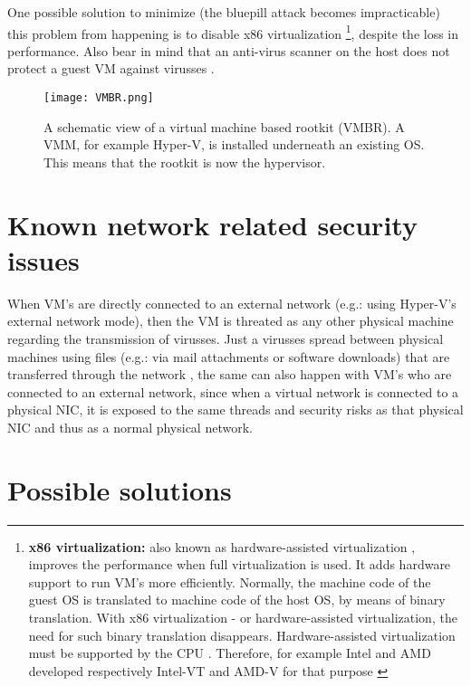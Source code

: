 One possible solution to minimize (the bluepill attack becomes impracticable) this problem from happening is to disable x86 virtualization \footnote{\textbf{x86 virtualization:} also known as hardware-assisted virtualization \citep{HardwareVirt1}, improves the performance when full virtualization is used. It adds hardware support to run VM's more efficiently. Normally, the machine code of the guest OS is translated to machine code of the host OS, by means of binary translation. With x86 virtualization - or hardware-assisted virtualization, the need for such binary translation disappears. Hardware-assisted virtualization must be supported by the CPU \citep{HardwareVirt3}. Therefore, for example Intel and AMD developed respectively Intel-VT and AMD-V for that purpose \citep{HardwareVirt2}}, despite the loss in performance. Also bear in mind that an anti-virus scanner on the host does not protect a guest VM against virusses \citep{Virus}. 
\begin{figure}[h]
	\label{fig:LibVirt}
    \centering
    \texttt{[image: VMBR.png]}
    \caption[VM based rootkit]{A schematic view of a virtual machine based rootkit (VMBR). A VMM, for example Hyper-V, is installed underneath an existing OS. This means that the rootkit is now the hypervisor.}
\end{figure}

\clearpage

\section{Known network related security issues} 

When VM's are directly connected to an external network (e.g.: using Hyper-V's external network mode), then the VM is threated as any other physical machine regarding the transmission of virusses. Just a virusses spread between physical machines using files (e.g.: via mail attachments or software downloads) that are transferred through the network \citep{Virus}, the same can also happen with VM's who are connected to an external network, since when a virtual network is connected to a physical NIC, it is exposed to the same threads and security risks as that physical NIC and thus as a normal physical network\citep{Virus2}.

\section{Possible solutions}

